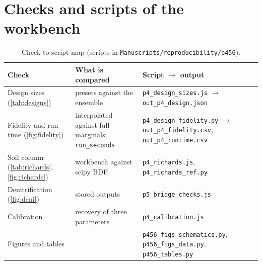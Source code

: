 \documentclass[preprint,12pt]{elsarticle}
\begin{document}
\section{Checks and scripts of the workbench}\label{app:repro4}
\begin{table}[H]\centering\small
\caption{Check to script map (scripts in \texttt{Manuscripts/reproducibility/p456}).}
\begin{tabularx}{\textwidth}{>{\raggedright\arraybackslash}p{4.4cm}>{\raggedright\arraybackslash}p{4.4cm}X}
\toprule Check & What is compared & Script $\to$ output\\\midrule
Design sizes (\cref{tab:designs}) & presets against the ensemble & \texttt{p4\_design\_sizes.js} $\to$ \texttt{out\_p4\_design.json}\\
Fidelity and run time (\cref{fig:fidelity}) & interpolated against full marginals; \texttt{run\_seconds} & \texttt{p4\_design\_fidelity.py} $\to$ \texttt{out\_p4\_fidelity.csv}, \texttt{out\_p4\_runtime.csv}\\
Soil column (\cref{tab:richards}, \cref{fig:richards}) & workbench against scipy BDF & \texttt{p4\_richards.js}, \texttt{p4\_richards\_ref.py}\\
Denitrification (\cref{fig:deni}) & 792 stored outputs & \texttt{p5\_bridge\_checks.js}\\
Calibration & recovery of three parameters & \texttt{p4\_calibration.js}\\
Figures and tables & & \texttt{p456\_figs\_schematics.py}, \texttt{p456\_figs\_data.py}, \texttt{p456\_tables.py}\\\bottomrule
\end{tabularx}
\end{table}
\end{document}
